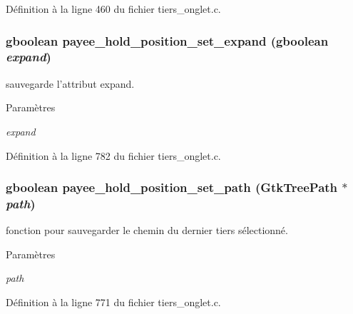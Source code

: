 Définition à la ligne 460 du fichier tiers\_\-onglet.c.

\subsubsection[{payee\_\-hold\_\-position\_\-set\_\-expand}]{\setlength{\rightskip}{0pt plus 5cm}gboolean payee\_\-hold\_\-position\_\-set\_\-expand (gboolean {\em expand})}\label{tiers__onglet_8h_ac46dd13ab4a32f28d80c2d94535b58ca}
sauvegarde l'attribut expand.


\begin{DoxyParams}{Paramètres}
\item[{\em expand}]\end{DoxyParams}


Définition à la ligne 782 du fichier tiers\_\-onglet.c.

\subsubsection[{payee\_\-hold\_\-position\_\-set\_\-path}]{\setlength{\rightskip}{0pt plus 5cm}gboolean payee\_\-hold\_\-position\_\-set\_\-path (GtkTreePath $\ast$ {\em path})}\label{tiers__onglet_8h_a07d4064288024467a46893089d1a25c7}
fonction pour sauvegarder le chemin du dernier tiers sélectionné.


\begin{DoxyParams}{Paramètres}
\item[{\em path}]\end{DoxyParams}


Définition à la ligne 771 du fichier tiers\_\-onglet.c.

